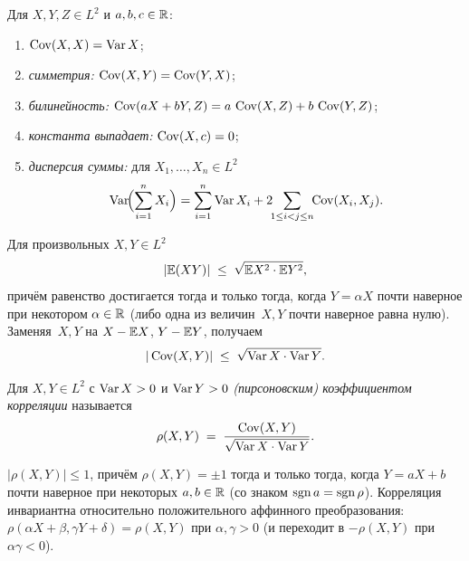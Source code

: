 \begin{proposition}
\label{prop:cov-properties}
Для $X, Y, Z \in L^2$ и $a, b, c \in \mathbb{R}$:
\begin{enumerate}[label=(\alph*)]
  \item $\operatorname{Cov}(X, X) = \operatorname{Var} X$;
  \item \emph{симметрия:} $\operatorname{Cov}(X, Y) = \operatorname{Cov}(Y, X)$;
  \item \emph{билинейность:} $\operatorname{Cov}(aX + bY, Z) = a\, \operatorname{Cov}(X, Z) + b\, \operatorname{Cov}(Y, Z)$;
  \item \emph{константа выпадает:} $\operatorname{Cov}(X, c) = 0$;
  \item \emph{дисперсия суммы:} для $X_1, \dots, X_n \in L^2$
        \[
          \operatorname{Var}\!\Bigl(\sum_{i=1}^n X_i\Bigr) = \sum_{i=1}^n \operatorname{Var} X_i + 2 \!\!\sum_{1 \leq i < j \leq n}\!\! \operatorname{Cov}(X_i, X_j).
        \]
\end{enumerate}
\end{proposition}

\begin{theorem}
\label{thm:cauchy-schwarz}
Для произвольных $X, Y \in L^2$
\[
  |\mathbb{E}(XY)| \;\leq\; \sqrt{\mathbb{E} X^2 \cdot \mathbb{E} Y^2},
\]
причём равенство достигается тогда и только тогда, когда $Y = \alpha X$ почти наверное при некотором $\alpha \in \mathbb{R}$ (либо одна из величин~$X, Y$ почти наверное равна нулю). Заменяя~$X, Y$ на $X - \mathbb{E} X$, $Y - \mathbb{E} Y$, получаем
\[
  |\operatorname{Cov}(X, Y)| \;\leq\; \sqrt{\operatorname{Var} X \cdot \operatorname{Var} Y}.
\]
\end{theorem}

\begin{definition}
\label{def:correlation}
Для $X, Y \in L^2$ с $\operatorname{Var} X > 0$ и $\operatorname{Var} Y > 0$ \emph{(пирсоновским) коэффициентом корреляции} называется
\[
  \rho(X, Y) \;=\; \frac{\operatorname{Cov}(X, Y)}{\sqrt{\operatorname{Var} X \cdot \operatorname{Var} Y}}.
\]
\end{definition}

\begin{corollary}
\label{cor:rho-properties}
$|\rho(X, Y)| \leq 1$, причём $\rho(X, Y) = \pm 1$ тогда и только тогда, когда $Y = aX + b$ почти наверное при некоторых $a, b \in \mathbb{R}$ (со знаком $\operatorname{sgn} a = \operatorname{sgn} \rho$). Корреляция инвариантна относительно положительного аффинного преобразования: $\rho(\alpha X + \beta, \gamma Y + \delta) = \rho(X, Y)$ при $\alpha, \gamma > 0$ (и переходит в $-\rho(X, Y)$ при $\alpha \gamma < 0$).
\end{corollary}

